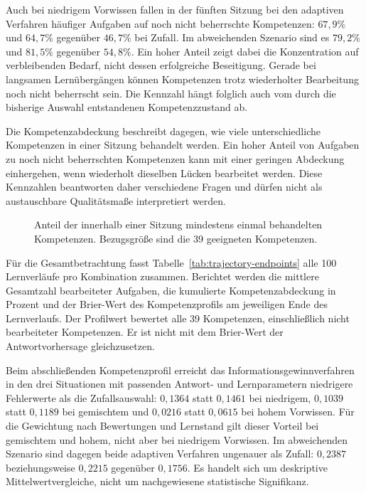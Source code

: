 Auch bei niedrigem Vorwissen fallen in der fünften Sitzung bei den
adaptiven Verfahren häufiger Aufgaben auf noch nicht beherrschte
Kompetenzen: $67{,}9\%$ und $64{,}7\%$ gegenüber $46{,}7\%$ bei Zufall.
Im abweichenden Szenario sind es $79{,}2\%$ und $81{,}5\%$ gegenüber
$54{,}8\%$. Ein hoher Anteil zeigt dabei die Konzentration auf
verbleibenden Bedarf, nicht dessen erfolgreiche Beseitigung. Gerade
bei langsamen Lernübergängen können Kompetenzen trotz wiederholter
Bearbeitung noch nicht beherrscht sein. Die Kennzahl hängt folglich
auch vom durch die bisherige Auswahl entstandenen Kompetenzzustand ab.

Die Kompetenzabdeckung beschreibt dagegen, wie viele unterschiedliche
Kompetenzen in einer Sitzung behandelt werden. Ein hoher Anteil von
Aufgaben zu noch nicht beherrschten Kompetenzen kann mit einer geringen
Abdeckung einhergehen, wenn wiederholt dieselben Lücken bearbeitet werden.
Diese Kennzahlen beantworten daher verschiedene Fragen und dürfen nicht
als austauschbare Qualitätsmaße interpretiert werden.

\begin{figure}[htbp]
  \centering
  \EvaluationCoveragePlot
  \caption{Anteil der innerhalb einer Sitzung mindestens einmal
    behandelten Kompetenzen. Bezugsgröße sind die 39 geeigneten Kompetenzen.}
  \label{fig:coverage}
\end{figure}

Für die Gesamtbetrachtung fasst Tabelle~\ref{tab:trajectory-endpoints}
alle 100 Lernverläufe pro Kombination zusammen. Berichtet werden die
mittlere Gesamtzahl bearbeiteter Aufgaben, die kumulierte
Kompetenzabdeckung in Prozent und der Brier-Wert des Kompetenzprofils am
jeweiligen Ende des Lernverlaufs. Der Profilwert bewertet alle 39
Kompetenzen, einschließlich nicht bearbeiteter Kompetenzen. Er ist nicht
mit dem Brier-Wert der Antwortvorhersage gleichzusetzen.

\begin{table}[htbp]
  \centering
  \resizebox{\textwidth}{!}{\EvaluationEndpointTable}
  \caption{Gesamtbetrachtung bis einschließlich der fünften Sitzung.
    Pro Kombination gehen alle 100 Lernverläufe ein; bei früherem Ende
    wird deren letzter Zustand verwendet. Abdeckung in Prozent.
    Weniger Aufgaben bedeuten nicht automatisch mehr Effizienz, da das
    Evidenzkriterium keine nachgewiesene Kompetenzbeherrschung verlangt.}
  \label{tab:trajectory-endpoints}
\end{table}

Beim abschließenden Kompetenzprofil erreicht das Informationsgewinnverfahren
in den drei Situationen mit passenden Antwort- und Lernparametern
niedrigere Fehlerwerte als die Zufallsauswahl: $0{,}1364$ statt $0{,}1461$
bei niedrigem, $0{,}1039$ statt $0{,}1189$ bei gemischtem und $0{,}0216$
statt $0{,}0615$ bei hohem Vorwissen. Für die Gewichtung nach Bewertungen
und Lernstand gilt dieser Vorteil bei gemischtem und hohem, nicht aber
bei niedrigem Vorwissen. Im abweichenden Szenario sind dagegen beide
adaptiven Verfahren ungenauer als Zufall: $0{,}2387$ beziehungsweise
$0{,}2215$ gegenüber $0{,}1756$. Es handelt sich um deskriptive
Mittelwertvergleiche, nicht um nachgewiesene statistische Signifikanz.

